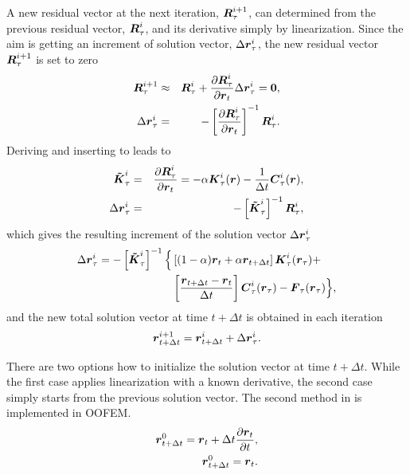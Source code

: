 A new residual vector at the next iteration, $\mbox{\boldmath$R$}_\tau^{i+1}$, can determined from the previous residual vector, $\mbox{\boldmath$R$}_{\tau}^i$, and its derivative simply by linearization. Since the aim is getting an increment of solution vector, $\Delta\mbox{\boldmath$r$}_{\tau}^i$, the new residual vector $\mbox{\boldmath$R$}_{\tau}^{i+1}$ is set to zero
\begin{eqnarray}
\mbox{\boldmath$R$}_\tau^{i+1} &\approx& \mbox{\boldmath$R$}_{\tau}^i+\frac{\partial{\mbox{\boldmath$R$}_{\tau}^i}}{\partial\mbox{\boldmath$r$}_t} \Delta\mbox{\boldmath$r$}_{\tau}^i = \mbox{\boldmath$0$},\label{NonNonTrans:7}\\
\Delta \mbox{\boldmath$r$}_{\tau}^i &=& - \left[\frac{\partial{\mbox{\boldmath$R$}_{\tau}^i}}{\partial\mbox{\boldmath$r$}_t}\right]^{-1} \mbox{\boldmath$R$}_{\tau}^i\label{NonNonTrans:8}.
\end{eqnarray}
Deriving  and inserting to  leads to
\begin{eqnarray}
\mbox{\boldmath$\tilde K$}_\tau^i &=& \frac{\partial{\mbox{\boldmath$R$}_{\tau}^i}}{\partial\mbox{\boldmath$r$}_t} = -\alpha \mbox{\boldmath$K$}_{\tau}^i(\mbox{\boldmath$r$}) - \mbox{$\displaystyle\frac{1}{\Delta
t}$}\mbox{\boldmath$C$}_{\tau}^i(\mbox{\boldmath$r$})\label{NonNonTrans:9},\\
\Delta \mbox{\boldmath$r$}_{\tau}^i &=& - \left[\mbox{\boldmath$\tilde K$}_\tau^i\right]^{-1} \mbox{\boldmath$R$}_{\tau}^i,\label{NonNonTrans:10}
\end{eqnarray}
which gives the resulting increment of the solution vector $\Delta \mbox{\boldmath$r$}_{\tau}^i$
\begin{equation}
\begin{split}
\Delta \mbox{\boldmath$r$}_{\tau}^i = - \left[\mbox{\boldmath$\tilde K$}_\tau^i\right]^{-1} \Big\{ &\left[(1-\alpha)\mbox{\boldmath$r$}_t + \alpha\mbox{\boldmath$r$}_{t+\Delta t} \right] \mbox{\boldmath$K$}_{\tau}^i(\mbox{\boldmath$r$}_\tau) +\\
&\left[\mbox{$\displaystyle\frac{\mbox{\boldmath$r$}_{t+\Delta t}-\mbox{\boldmath$r$}_t}{\Delta t}$}\right] \mbox{\boldmath$C$}_{\tau}^i(\mbox{\boldmath$r$}_\tau) - \mbox{\boldmath$F$}_{\tau}(\mbox{\boldmath$r$}_\tau) \Big\},\label{NonNonTrans:11}
\end{split}
\end{equation}
and the new total solution vector at time $t + \Delta t$ is obtained in each iteration
\begin{eqnarray}
\mbox{\boldmath$r$}_{t+\Delta t}^{i+1}=\mbox{\boldmath$r$}_{t+\Delta t}^{i} + \Delta\mbox{\boldmath$r$}_{\tau}^i.\label{NonNonTrans:12}
\end{eqnarray}

There are two options how to initialize the solution vector at time $t + \Delta t$. While the first case applies linearization with a known derivative, the second case simply starts from the previous solution vector. The second method in  is implemented in OOFEM.
\begin{eqnarray}
\mbox{\boldmath$r$}_{t+\Delta t}^{0} = \mbox{\boldmath$r$}_t + \Delta t\frac{\partial{\mbox{\boldmath$r$}_t}}{\partial t},\label{NonNonTrans:13}\\
\mbox{\boldmath$r$}_{t+\Delta t}^{0} = \mbox{\boldmath$r$}_t.\label{NonNonTrans:14}
\end{eqnarray}

